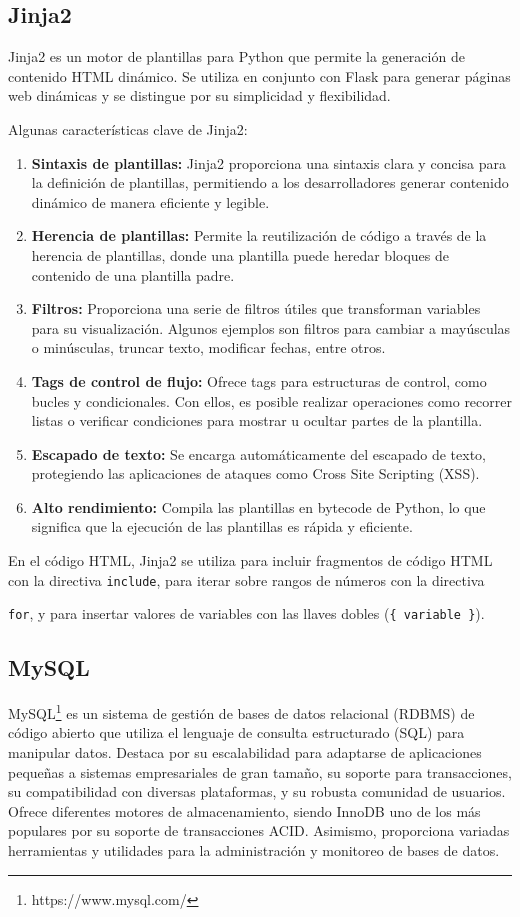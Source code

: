 \documentclass[a4paper, 12pt]{book}
\begin{document}
\subsection{Jinja2}
\label{subsec:jinja2} Jinja2 es un motor de plantillas para Python que permite la generación de contenido HTML dinámico. Se utiliza en conjunto con Flask para 
generar páginas web dinámicas y se distingue por su simplicidad y flexibilidad. 

Algunas características clave de Jinja2:

\begin{enumerate}
  \item \textbf{Sintaxis de plantillas:} Jinja2 proporciona una sintaxis clara y concisa para la definición de plantillas, permitiendo a los desarrolladores generar 
  contenido dinámico de manera eficiente y legible.
  \item \textbf{Herencia de plantillas:} Permite la reutilización de código a través de la herencia de plantillas, donde una plantilla puede heredar bloques de contenido 
  de una plantilla padre.
  \item \textbf{Filtros:} Proporciona una serie de filtros útiles que transforman variables para su visualización. Algunos ejemplos son filtros para cambiar a mayúsculas 
  o minúsculas, truncar texto, modificar fechas, entre otros.
  \item \textbf{Tags de control de flujo:} Ofrece tags para estructuras de control, como bucles y condicionales. Con ellos, es posible realizar operaciones como recorrer 
  listas o verificar condiciones para mostrar u ocultar partes de la plantilla.
  \item \textbf{Escapado de texto:} Se encarga automáticamente del escapado de texto, protegiendo las aplicaciones de ataques como Cross Site Scripting (XSS).
  \item \textbf{Alto rendimiento:} Compila las plantillas en bytecode de Python, lo que significa que la ejecución de las plantillas es rápida y eficiente.
\end{enumerate}

En el código HTML, Jinja2 se utiliza para incluir fragmentos de código HTML con la directiva \texttt{include}, para iterar sobre rangos de números con la directiva 

\texttt{for}, y para insertar valores de variables con las llaves dobles (\texttt{{\{ variable \}}}).

\subsection{MySQL}
\label{subsec:mysql} MySQL\footnote{https://www.mysql.com/} es un sistema de gestión de bases de datos relacional (RDBMS) de código abierto que utiliza el lenguaje de consulta estructurado (SQL) 
para manipular datos. Destaca por su escalabilidad para adaptarse de aplicaciones pequeñas a sistemas empresariales de gran tamaño, su soporte para transacciones, 
su compatibilidad con diversas plataformas, y su robusta comunidad de usuarios. Ofrece diferentes motores de almacenamiento, siendo InnoDB uno de los más populares 
por su soporte de transacciones ACID. Asimismo, proporciona variadas herramientas y utilidades para la administración y monitoreo de bases de datos.
\end{document}
